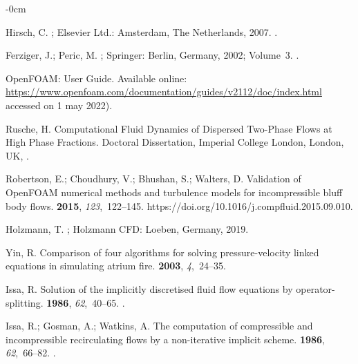 \documentclass[mathematics,article,accept,pdftex,moreauthors]{Definitions/mdpi}
\begin{document}
\begin{adjustwidth}{-\extralength}{0cm}
\begin{thebibliography}{999}
Hirsch, C.
; Elsevier Ltd.:  Amsterdam, The Netherlands, 
  2007.
.

Ferziger, J.; Peric, M.
; Springer:  Berlin, Germany, 
  2002; Volume~3. 
.

OpenFOAM: User Guide.
\newblock
  Available online:  \url{https://www.openfoam.com/documentation/guides/v2112/doc/index.html}  accessed on 1 may 2022). 

Rusche, H.
\newblock Computational Fluid Dynamics of Dispersed Two-Phase Flows at High
  Phase Fractions. Doctoral Dissertation, Imperial College London,  London, UK, 
.

Robertson, E.; Choudhury, V.; Bhushan, S.; Walters, D.
\newblock Validation of OpenFOAM numerical methods and turbulence models for
  incompressible bluff body flows.
 {\bf 2015}, {\em 123},~122--145.
\newblock
  {{https://doi.org/10.1016/j.compfluid.2015.09.010}}.

Holzmann, T.
;  Holzmann CFD: Loeben, Germany, 2019. 

Yin, R.
\newblock Comparison of four algorithms for solving pressure-velocity linked
  equations in simulating atrium fire.
 {\bf 2003}, {\em 4},~24--35.

Issa, R.
\newblock Solution of the implicitly discretised fluid flow equations by
  operator-splitting.
 {\bf 1986}, {\em 62},~40--65.
.

Issa, R.; Gosman, A.; Watkins, A.
\newblock The computation of compressible and incompressible recirculating
  flows by a non-iterative implicit scheme.
 {\bf 1986}, {\em 62},~66--82.
.


\end{thebibliography}
\end{adjustwidth}
\end{document}
